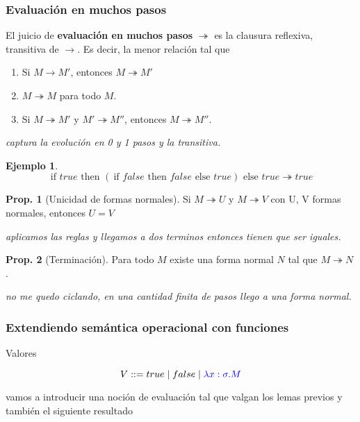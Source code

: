 \documentclass{report}
\theoremstyle{definition} %
\newtheorem{proposition}{Prop.}[chapter]
\newtheorem*{example*}{Ejemplo}
\newcommand{\ifte}[3]{\ \text{if } #1 \text{ then } #2 \text{ else } #3}
\newcommand{\abs}[3]{\lambda #1 : #2 . #3}
\newcommand{\reduce}[2]{#1 \to #2}
\newcommand{\reduceManyTo}{\twoheadrightarrow}
\newcommand{\reduceMany}[2]{#1 \reduceManyTo #2}
\begin{document}
\subsubsection{Evaluación en muchos pasos}

El juicio de \textbf{evaluación en muchos pasos} $\reduceManyTo$ es la
clausura reflexiva, transitiva de $\to$. Es decir, la menor relación tal que

\begin{enumerate}
    \item Si $\reduce{M}{M'}$, entonces $\reduceMany{M}{M'}$
    \item $\reduceMany{M}{M}$ para todo $M$.
    \item Si $\reduceMany{M}{M'}$ y $\reduceMany{M'}{M''}$, entonces $\reduceMany{M}{M''}$.
\end{enumerate}

\textit{captura la evolución en 0 y 1 pasos y la transitiva.}

\begin{example*}
    \[
    \reduceMany
        {\ifte{true}{(\ifte{false}{false}{true})}{true}}
        {true}
    \]
\end{example*}

\begin{proposition}[Unicidad de formas normales]
    Si $\reduceMany{M}{U}$ y $\reduceMany{M}{V}$ con U, V formas normales,
    entonces $U = V$

    \textit{aplicamos las reglas y llegamos a dos terminos entonces tienen que
    ser iguales.}
\end{proposition}

\begin{proposition}[Terminación]
    Para todo $M$ existe una forma normal $N$ tal que $\reduceMany{M}{N}$.

    \textit{no me quedo ciclando, en una cantidad finita de pasos llego a una forma normal.}
\end{proposition}

\subsubsection{Extendiendo semántica operacional con funciones}

Valores

\[
    V ::= true \mid false \mid \textcolor{blue}{\abs{x}{\sigma}{M}}
\]

vamos a introducir una noción de evaluación tal que valgan los lemas previos y
también el siguiente resultado
\end{document}

